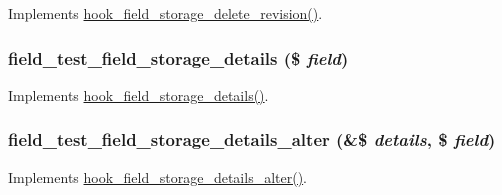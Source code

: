 \label{field__test_8storage_8inc_a2bbfdc99551c6d326bb28324a88a0ffc}
Implements \hyperlink{group__field__storage_ga74ff0893fd8d05ab372bd4b65d0ffc71}{hook\_\-field\_\-storage\_\-delete\_\-revision()}. \hypertarget{field__test_8storage_8inc_a13b21ea3b360341839b6082c2836e5eb}{
\subsubsection[{field\_\-test\_\-field\_\-storage\_\-details}]{\setlength{\rightskip}{0pt plus 5cm}field\_\-test\_\-field\_\-storage\_\-details (\$ {\em field})}}
\label{field__test_8storage_8inc_a13b21ea3b360341839b6082c2836e5eb}
Implements \hyperlink{group__field__storage_ga72b4d22502ffc709e50de0ba4f417062}{hook\_\-field\_\-storage\_\-details()}. \hypertarget{field__test_8storage_8inc_a7aadff122767aac99f03d92e52d891cd}{
\subsubsection[{field\_\-test\_\-field\_\-storage\_\-details\_\-alter}]{\setlength{\rightskip}{0pt plus 5cm}field\_\-test\_\-field\_\-storage\_\-details\_\-alter (\&\$ {\em details}, \/  \$ {\em field})}}
\label{field__test_8storage_8inc_a7aadff122767aac99f03d92e52d891cd}
Implements \hyperlink{group__field__storage_gae79d6c32c896d3db208c90f3ab1b1ad0}{hook\_\-field\_\-storage\_\-details\_\-alter()}.

